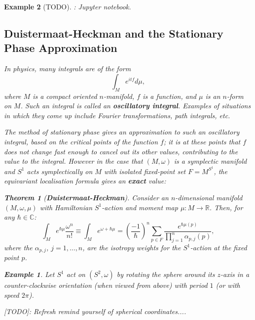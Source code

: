 \documentclass{article}
\newtheorem{theorem}{Theorem}[section]
\newtheorem{example}{Example}
\newcommand{\ra}{\rightarrow}
\newcommand{\w}{\omega}
\newcommand{\RR}{\mathbb{R}}
\newcommand{\CC}{\mathbb{C}}
\begin{document}
\begin{example}
[TODO]: Jupyter notebook.

\subsection{Duistermaat-Heckman and the Stationary Phase Approximation}

In physics, many integrals are of the form
\begin{equation*}
	\int_{M} e^{itf}d\mu,
\end{equation*}
where $M$ is a compact oriented $n$-manifold, $f$ is a function, and $\mu$ is an $n$-form on $M$. Such an integral is called an \textbf{oscillatory integral}. Examples of situations in which they come up include Fourier transformations, path integrals, etc.

The method of stationary phase gives an approximation to such an oscillatory integral, based on the critical points of the function $f$; it is at these points that $f$ does not change fast enough to cancel out its other values, contributing to the value to the integral. However in the case that $(M, \w)$ is a symplectic manifold and $S^{1}$ acts symplectically on $M$ with isolated fixed-point set $F = M^{S^{1}}$, the equivariant localisation formula gives an \textbf{exact} value:

\begin{theorem}[\textbf{Duistermaat-Heckman}]
	Consider an $n$-dimensional manifold $(M, \w, \mu)$ with Hamiltonian $S^{1}$-action and moment map $\mu : M \ra \RR$. Then, for any $\hbar \in \CC$:
	\begin{equation*}
		\int_{M} e^{\hbar \mu} \frac{\w^{n}}{n!} \equiv \int_{M} e^{\w + \hbar \mu} = \left(\frac{-1}{\hbar}\right)^{n} \sum_{p\in F} \frac{e^{\hbar \mu(p)}}{\prod_{j=1}^{n}\alpha_{p,j}(p)},
	\end{equation*}
	where the $\alpha_{p,j}$, $j = 1, \ldots, n$, are the isotropy weights for the $S^{1}$-action at the fixed point $p$.
\end{theorem}

\begin{example}
	Let $S^{1}$ act on $(S^{2}, \w)$ by rotating the sphere around its $z$-axis in a counter-clockwise orientation (when viewed from above) with period $1$ (or with speed $2\pi$). 
	
	[TODO]: Refresh remind yourself of spherical coordinates....

\end{example}


\end{example}
\end{document}
